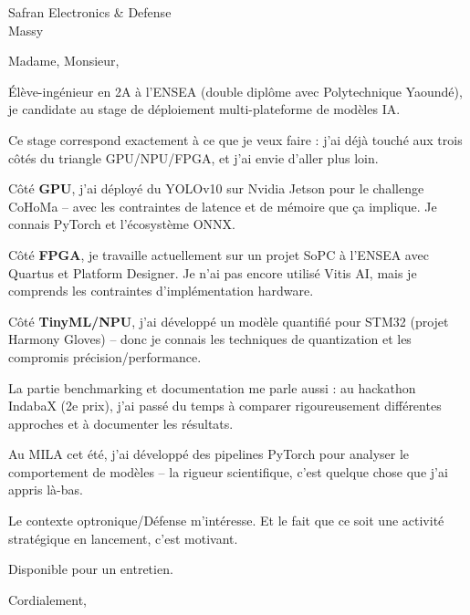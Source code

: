 \documentclass[11pt,a4paper]{letter}
\begin{document}
\begin{letter}{Safran Electronics \& Defense\\
Massy}

\opening{Madame, Monsieur,}

Élève-ingénieur en 2A à l'ENSEA (double diplôme avec Polytechnique Yaoundé), je candidate au stage de déploiement multi-plateforme de modèles IA.

Ce stage correspond exactement à ce que je veux faire : j'ai déjà touché aux trois côtés du triangle GPU/NPU/FPGA, et j'ai envie d'aller plus loin.

Côté \textbf{GPU}, j'ai déployé du YOLOv10 sur Nvidia Jetson pour le challenge CoHoMa -- avec les contraintes de latence et de mémoire que ça implique. Je connais PyTorch et l'écosystème ONNX.

Côté \textbf{FPGA}, je travaille actuellement sur un projet SoPC à l'ENSEA avec Quartus et Platform Designer. Je n'ai pas encore utilisé Vitis AI, mais je comprends les contraintes d'implémentation hardware.

Côté \textbf{TinyML/NPU}, j'ai développé un modèle quantifié pour STM32 (projet Harmony Gloves) -- donc je connais les techniques de quantization et les compromis précision/performance.

La partie benchmarking et documentation me parle aussi : au hackathon IndabaX (2e prix), j'ai passé du temps à comparer rigoureusement différentes approches et à documenter les résultats.

Au MILA cet été, j'ai développé des pipelines PyTorch pour analyser le comportement de modèles -- la rigueur scientifique, c'est quelque chose que j'ai appris là-bas.

Le contexte optronique/Défense m'intéresse. Et le fait que ce soit une activité stratégique en lancement, c'est motivant.

Disponible pour un entretien.

\closing{Cordialement,}

\end{letter}
\end{document}
